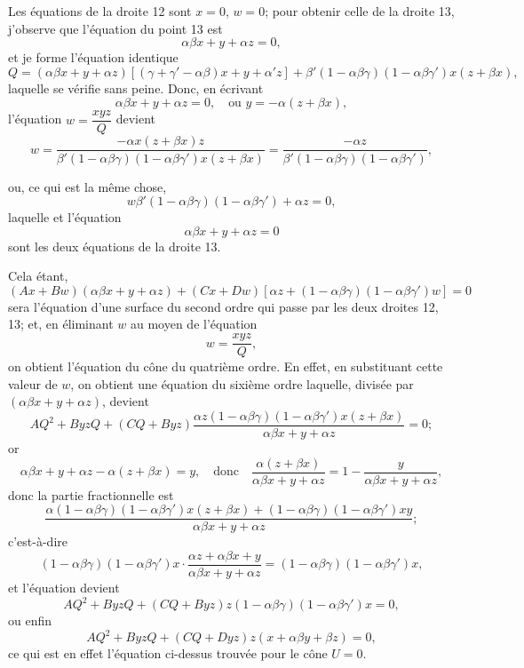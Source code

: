 \documentclass[11pt,a4paper]{article}
\begin{document}
Les \'{e}quations de la droite 12 sont $x = 0$, $w = 0$; pour obtenir celle de la droite 13, j'observe que l'\'{e}quation du point 13 est
\[
\alpha\beta x + y + \alpha z = 0,
\]
et je forme l'\'{e}quation identique
\[
Q = (\alpha\beta x + y + \alpha z)[(\gamma + \gamma' - \alpha\beta)x + y + \alpha' z] + \beta' (1 - \alpha\beta\gamma)(1 - \alpha\beta\gamma') x (z + \beta x),
\]
laquelle se v\'{e}rifie sans peine. Donc, en \'{e}crivant
\[
\alpha\beta x + y + \alpha z = 0, \quad \text{ou } y = -\alpha(z + \beta x),
\]
l'\'{e}quation $w = \dfrac{xyz}{Q}$ devient
\[
w = \frac{-\alpha x (z + \beta x) z}{\beta' (1 - \alpha\beta\gamma)(1 - \alpha\beta\gamma') x (z + \beta x)} = \frac{-\alpha z}{\beta' (1 - \alpha\beta\gamma)(1 - \alpha\beta\gamma')},
\]

\clearpage

ou, ce qui est la m\^{e}me chose,
\[
w \beta' (1 - \alpha\beta\gamma)(1 - \alpha\beta\gamma') + \alpha z = 0,
\]
laquelle et l'\'{e}quation
\[
\alpha\beta x + y + \alpha z = 0
\]
sont les deux \'{e}quations de la droite 13.

Cela \'{e}tant,
\[
(Ax + Bw)(\alpha\beta x + y + \alpha z) + (Cx + Dw)[\alpha z + (1 - \alpha\beta\gamma)(1 - \alpha\beta\gamma') w] = 0
\]
sera l'\'{e}quation d'une surface du second ordre qui passe par les deux droites 12, 13; et, en \'{e}liminant $w$ au moyen de l'\'{e}quation
\[
w = \frac{xyz}{Q},
\]
on obtient l'\'{e}quation du c\^{o}ne du quatri\`{e}me ordre. En effet, en substituant cette valeur de $w$, on obtient une \'{e}quation du sixi\`{e}me ordre laquelle, divis\'{e}e par $(\alpha\beta x + y + \alpha z)$, devient
\[
AQ^2 + ByzQ + (CQ + Byz)\frac{\alpha z (1 - \alpha\beta\gamma)(1 - \alpha\beta\gamma') x (z + \beta x)}{\alpha\beta x + y + \alpha z} = 0;
\]
or
\[
\alpha\beta x + y + \alpha z - \alpha (z + \beta x) = y, \quad \text{donc} \quad \frac{\alpha (z + \beta x)}{\alpha\beta x + y + \alpha z} = 1 - \frac{y}{\alpha\beta x + y + \alpha z},
\]
donc la partie fractionnelle est
\[
\frac{\alpha (1 - \alpha\beta\gamma)(1 - \alpha\beta\gamma') x (z + \beta x) + (1 - \alpha\beta\gamma)(1 - \alpha\beta\gamma') xy}{\alpha\beta x + y + \alpha z};
\]
c'est-\`{a}-dire
\[
(1 - \alpha\beta\gamma)(1 - \alpha\beta\gamma') x \cdot \frac{\alpha z + \alpha\beta x + y}{\alpha\beta x + y + \alpha z} = (1 - \alpha\beta\gamma)(1 - \alpha\beta\gamma') x,
\]
et l'\'{e}quation devient
\[
AQ^2 + ByzQ + (CQ + Byz) z (1 - \alpha\beta\gamma)(1 - \alpha\beta\gamma') x = 0,
\]
ou enfin
\[
AQ^2 + ByzQ + (CQ + Dyz) z (x + \alpha\beta y + \beta z) = 0,
\]
ce qui est en effet l'\'{e}quation ci-dessus trouv\'{e}e pour le c\^{o}ne $U = 0$.
\end{document}
